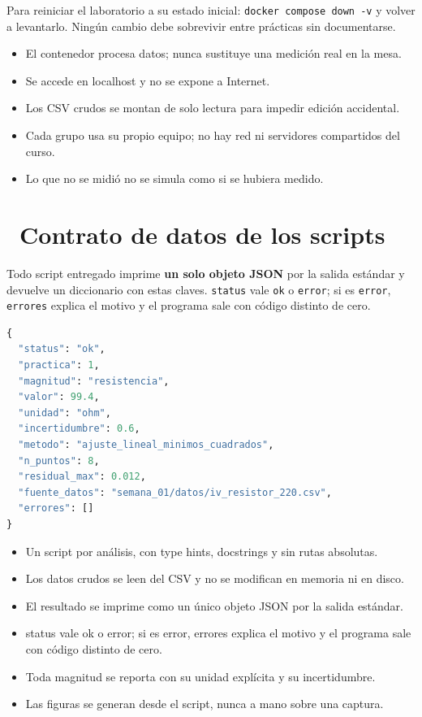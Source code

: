 \documentclass[11pt,a4paper]{article}
\newcommand{\iconotexto}[2]{\textcolor{cyanNeon}{\faIcon{#1}}~#2}
\begin{document}
\begin{cajaRecuerda}Para reiniciar el laboratorio a su estado inicial: \texttt{docker compose down -v} y volver a levantarlo. Ningún cambio debe sobrevivir entre prácticas sin documentarse.
\end{cajaRecuerda}

\begin{itemize}[leftmargin=1.4em,itemsep=2pt,topsep=3pt]
  \item El contenedor procesa datos; nunca sustituye una medición real en la mesa.
  \item Se accede en localhost y no se expone a Internet.
  \item Los CSV crudos se montan de solo lectura para impedir edición accidental.
  \item Cada grupo usa su propio equipo; no hay red ni servidores compartidos del curso.
  \item Lo que no se midió no se simula como si se hubiera medido.
\end{itemize}

\section{\iconotexto{code}{Contrato de datos de los scripts}}

\begin{cajaConcepto}Todo script entregado imprime \textbf{un solo objeto JSON} por la salida estándar y devuelve un diccionario con estas claves. \texttt{status} vale \texttt{ok} o \texttt{error}; si es \texttt{error}, \texttt{errores} explica el motivo y el programa sale con código distinto de cero.
\begin{lstlisting}[language=Python,style=estiloPython]
{
  "status": "ok",
  "practica": 1,
  "magnitud": "resistencia",
  "valor": 99.4,
  "unidad": "ohm",
  "incertidumbre": 0.6,
  "metodo": "ajuste_lineal_minimos_cuadrados",
  "n_puntos": 8,
  "residual_max": 0.012,
  "fuente_datos": "semana_01/datos/iv_resistor_220.csv",
  "errores": []
}

\end{lstlisting}
\end{cajaConcepto}

\begin{itemize}[leftmargin=1.4em,itemsep=2pt,topsep=3pt]
  \item Un script por análisis, con type hints, docstrings y sin rutas absolutas.
  \item Los datos crudos se leen del CSV y no se modifican en memoria ni en disco.
  \item El resultado se imprime como un único objeto JSON por la salida estándar.
  \item status vale ok o error; si es error, errores explica el motivo y el programa sale con código distinto de cero.
  \item Toda magnitud se reporta con su unidad explícita y su incertidumbre.
  \item Las figuras se generan desde el script, nunca a mano sobre una captura.
\end{itemize}
\end{document}
